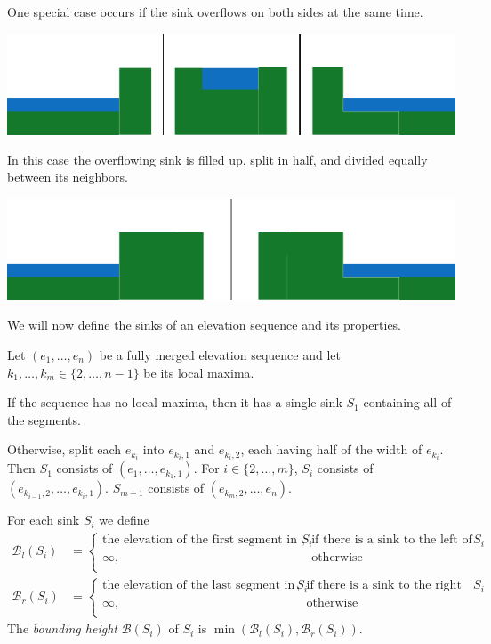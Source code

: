 \documentclass[11pt,a4paper]{article}
\begin{document}
One special case occurs if the sink overflows on both sides at the same time.
\begin{center}
  \includegraphics{im13.pdf}
\end{center}
In this case the overflowing sink is filled up, split in half, and divided equally between its neighbors.
\begin{center}
  \includegraphics{im14.pdf}
\end{center}

We will now define the sinks of an elevation sequence and its properties.

Let $(e_1,\ldots,e_n)$ be a fully merged elevation sequence and let $k_1,\ldots,k_m \in \{2,\ldots,n-1\}$ be its local maxima.

If the sequence has no local maxima, then it has a single sink $S_1$ containing all of the segments.

Otherwise, split each $e_{k_i}$ into $e_{k_i,1}$ and $e_{k_i,2}$, each having half of the width of $e_{k_i}$.
Then $S_1$ consists of $(e_1,\ldots,e_{k_1,1})$.
For $i\in\{2,\ldots,m\}$, $S_i$ consists of $(e_{k_{i-1},2},\ldots,e_{k_i,1})$.
$S_{m+1}$ consists of $(e_{k_m,2},\ldots,e_n)$.

For each sink $S_i$ we define
\begin{align*}
    \mathcal{B}_l(S_i) &=
        \begin{cases}
            \textrm{the elevation of the first segment in $S_i$}, & \textrm{if there is a sink to the left of $S_i$} \\
            \infty, & \textrm{otherwise} \\
        \end{cases} \\
    \mathcal{B}_r(S_i) &=
        \begin{cases}
            \textrm{the elevation of the last segment in $S_i$}, & \textrm{if there is a sink to the right of $S_i$} \\
            \infty, & \textrm{otherwise} \\
        \end{cases}
\end{align*}
The \textit{bounding height} $\mathcal{B}(S_i)$ of $S_i$ is $\min(\mathcal{B}_l(S_i), \mathcal{B}_r(S_i))$.
\end{document}
